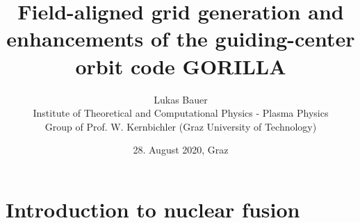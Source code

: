 \documentclass{beamer}
\title[]
{Field-aligned grid generation and \\
enhancements of the guiding-center \\
orbit code GORILLA}
\author[L.~Bauer]{\scriptsize Lukas Bauer\\
	Institute of Theoretical and Computational Physics - Plasma Physics\\Group of Prof. W. Kernbichler (Graz University of Technology)
}
\date{28. August 2020, Graz} %
\institute[Institute of Theoretical and Computational Physics]
{
}
\begin{document}
\titleframe


\section{Introduction to nuclear fusion}

\end{document}
